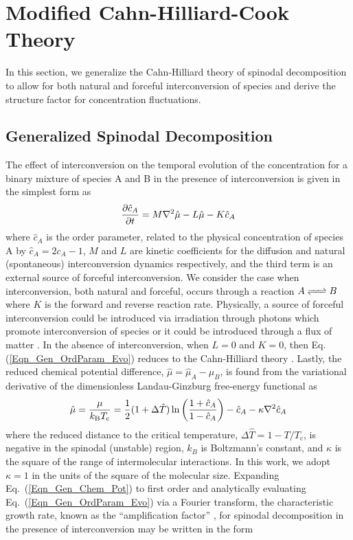 \documentclass[5p,twocolumn]{elsarticle}
\begin{document}
\section{Modified Cahn-Hilliard-Cook Theory}
In this section, we generalize the Cahn-Hilliard theory of spinodal decomposition to allow for both natural and forceful interconversion of species and derive the structure factor for concentration fluctuations.

\subsection{Generalized Spinodal Decomposition}
The effect of interconversion on the temporal evolution of the concentration for a binary mixture of species A and B in the presence of interconversion is given in the simplest form \cite{MFT_PT_2021} as
\begin{equation}\label{Eqn_Gen_OrdParam_Evo}
    \pdv{\hat{c}_A}{t} = M\laplacian{\hat{\mu}}-L\hat{\mu} - K\hat{c}_A
\end{equation}
where $\hat{c}_A$ is the order parameter, related to the physical concentration of species A by $\hat{c}_A = 2c_A-1$, $M$ and $L$ are kinetic coefficients for the diffusion and natural (spontaneous) interconversion dynamics respectively, and the third term is an external source of forceful interconversion. We consider the case when interconversion, both natural and forceful, occurs through a reaction $A \ce{<=>} B$ where $K$ is the forward and reverse reaction rate. Physically, a source of forceful interconversion could be introduced via irradiation through photons \cite{Bellon_2001} which promote interconversion of species or it could be introduced through a flux of matter \cite{Verdasca_Chemically_1995}. In the absence of interconversion, when $L = 0$ and $K = 0$, then Eq. (\ref{Eqn_Gen_OrdParam_Evo}) reduces to the Cahn-Hilliard theory \cite{cahn_phase_1965}. Lastly, the reduced chemical potential difference, $\hat{\mu} = \hat{\mu}_A -\hat{\mu}_B$, is found from the variational derivative of the dimensionless Landau-Ginzburg free-energy functional \cite{MFT_PT_2021} as 
\begin{equation}\label{Eqn_Gen_Chem_Pot}
    \hat{\mu} = \frac{{\mu}}{k_\text{B}T_\text{c}} = \frac{1}{2}(1+\Delta \hat{T})\ln\left(\frac{1+\hat{c}_A}{1-\hat{c}_A}\right)-\hat{c}_A -\kappa\laplacian{\hat{c}_A}
\end{equation}
where the reduced distance to the critical temperature, $\Delta\hat{T}=1-T/T_\text{c}$, is negative in the spinodal (unstable) region, $k_B$ is Boltzmann's constant, and $\kappa$ is the square of the range of intermolecular interactions. In this work, we adopt $\kappa = 1$ in the units of the square of the molecular size. Expanding Eq.~(\ref{Eqn_Gen_Chem_Pot}) to first order and analytically evaluating Eq.~(\ref{Eqn_Gen_OrdParam_Evo}) via a Fourier transform, the characteristic growth rate, known as the ``amplification factor'' \cite{Shum_Phase_2021,MFT_PT_2021,cahn_phase_1965}, for spinodal decomposition in the presence of interconversion may be written in the form \cite{MFT_PT_2021}
\end{document}
